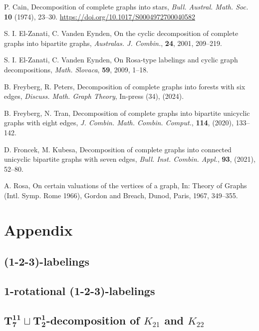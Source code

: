 \documentclass{dmgt}
\begin{document}

\begin{thebibliography}{20}

P. Cain, 
Decomposition of complete graphs into stars, 
\textit{Bull. Austral. Math. Soc.} \textbf{10} (1974), 23--30.
\url{https://doi.org/10.1017/S0004972700040582}

S. I. El-Zanati, C. Vanden Eynden,
On the cyclic decomposition of complete graphs into bipartite graphs,
\textit{Australas. J. Combin.}, \textbf{24}, 2001, 209--219.

S. I. El-Zanati, C. Vanden Eynden,
On Rosa-type labelings and cyclic graph decompositions,
\textit{Math. Slovaca}, \textbf{59}, 2009, 1--18.

B. Freyberg, R. Peters, 
Decomposition of complete graphs into forests with six edges, 
\textit{Discuss. Math. Graph Theory}, In-press (34), (2024).

B. Freyberg, N. Tran, 
Decomposition of complete graphs into bipartite unicyclic graphs with eight edges, 
\textit{J. Combin. Math. Combin. Comput.}, \textbf{114}, (2020), 133--142.

D. Froncek, M. Kubesa, 
Decomposition of complete graphs into connected unicyclic bipartite graphs with seven edges,
\textit{Bull. Inst. Combin. Appl.}, \textbf{93}, (2021), 52--80.

A. Rosa,
On certain valuations of the vertices of a graph,
In: Theory of Graphs (Intl. Symp. Rome 1966), Gordon and Breach, Dunod, Paris,
1967, 349--355.

\end{thebibliography}

\section{Appendix}

\subsection{(1-2-3)-labelings}
    
\subsection{1-rotational (1-2-3)-labelings}
    
\subsection{$\mathbf{T_{7}^{11}}\sqcup\mathbf{T_{2}^{1}}$-decomposition of $K_{21}$ and $K_{22}$}
    
\newpage
    
\end{document}
